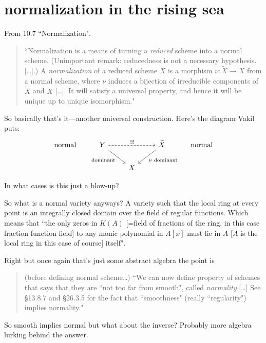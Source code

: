 \section*{normalization in the rising sea}


From \cite{sea} 10.7 ``Normalization".

\begin{quotation}
	``Normalization is a means of turning a \textit{reduced} scheme into a normal scheme. (Unimportant remark: reducedness is not a necessary hypothesis. […].) A \textit{normalization} of a reduced scheme \(X\) is a morphism \(\nu:\widetilde{X}\to X\) from a normal scheme, where \(\nu\) induces a bijection of irreducible components of \(\widetilde{X}\) and \(X\) […]. It will satisfy a universal property, and hence it will be unique up to unique isomorphism."
\end{quotation}
So basically that's it---another universal construction. Here's the diagram Vakil puts:
\[\begin{tikzcd}
\text{normal} &Y\arrow[rr,"\exists !",dashed]\arrow[dr,"\text{dominant} ",swap]&&\widetilde{X}\arrow[dl,"\nu\text{ dominant} "]& \text{ normal} \\
&&X
\end{tikzcd}\]

\begin{question}\leavevmode
In what cases is this just a blow-up?
\end{question}

\begin{question}\leavevmode
	So what is a normal variety anyways? A variety such that the local ring at every point is an integrally closed domain over the field of regular functions. Which means that ``the only zeros in \(K(A)\) [=field of fractions of the ring, in this case fraction function field] to any monic polynomial in \(A[x]\) must lie in \(A\) [\(A\) is the local ring in this case of course] itself".
\end{question}

Right but once again that's just some abstract algebra the point is
\begin{quotation}
	(before defining normal scheme…) ``We can now define  property of schemes that says that they are ``not too far from smooth", called \textit{normality} […] See §13.8.7 and §26.3.5 for the fact that ``smoothness" (really ``regularity") implies normality."
\end{quotation}
So smooth implies normal but what about the inverse? Probably more algebra lurking behind the answer.

